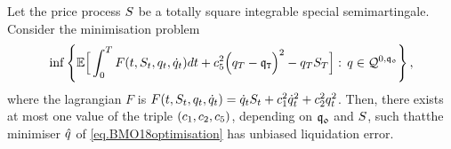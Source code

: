 \documentclass[10pt,a4paper]{article}
\begin{document}
\begin{prop}
  Let the price process $S$ be a totally square integrable special semimartingale. Consider the minimisation problem 
\begin{equation}
\label{eq.BMO18optimisation}
\inf\left\lbrace
\mathbb{{E}}\Big[
\int_{0}^{T}F(t,S_t,q_t,\dot{q}_{t}) dt 
+ c_{5}^{2} \Big(q_T - \mathfrak{q}_{\mathtt{T} }\Big)^{2} 
- q_{T} S_T 
\Big] : \, 
q \in \mathcal{Q}^{0,\mathfrak{q_0}}
\right\rbrace,
\end{equation}
where the lagrangian $F$ is $F(t,S_t,q_t,\dot{q}_{t})  = \dot{q}_{t} S_t + c_{1}^{2} \dot{q}_{t}^{2} + c_{2}^{2} q_{t}^{2}$.
  Then, there exists at most one value of the triple $(c_{1}, c_{2}, c_{5})$, depending on $\mathfrak{q_0}$ and $S$, such thatthe minimiser $\hat{q}$ of \eqref{eq.BMO18optimisation} has unbiased liquidation error. 
\end{prop}
\end{document}
